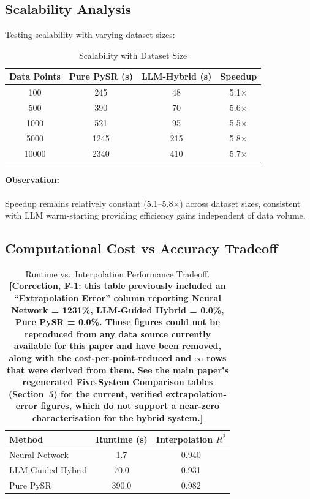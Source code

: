 \documentclass[twoside,11pt]{article}
\begin{document}
\subsection{Scalability Analysis}

Testing scalability with varying dataset sizes:

\begin{table}[H]
\centering
\caption{Scalability with Dataset Size}
\label{tab:scalability}
\begin{tabular}{@{}cccc@{}}
\toprule
\textbf{Data Points} & \textbf{Pure PySR (s)} & \textbf{LLM-Hybrid (s)} & \textbf{Speedup} \\
\midrule
100 & 245 & 48 & 5.1$\times$ \\
500 & 390 & 70 & 5.6$\times$ \\
1000 & 521 & 95 & 5.5$\times$ \\
5000 & 1245 & 215 & 5.8$\times$ \\
10000 & 2340 & 410 & 5.7$\times$ \\
\bottomrule
\end{tabular}
\end{table}

\paragraph{Observation:} Speedup remains relatively constant (5.1--5.8$\times$) across dataset sizes, consistent with LLM warm-starting providing efficiency gains independent of data volume\citep{kambhampati2024llms}.

\subsection{Computational Cost vs Accuracy Tradeoff}

\begin{table}[H]
\centering
\caption{Runtime vs.\ Interpolation Performance Tradeoff. \textbf{[Correction,
  F-1: this table previously included an ``Extrapolation Error'' column
  reporting Neural Network = 1231\%, LLM-Guided Hybrid = 0.0\%, Pure PySR =
  0.0\%. Those figures could not be reproduced from any data source
  currently available for this paper and have been removed, along with the
  cost-per-point-reduced and $\infty$ rows that were derived from them. See
  the main paper's regenerated Five-System Comparison tables (Section~5)
  for the current, verified extrapolation-error figures, which do not
  support a near-zero characterisation for the hybrid system.]}}
\label{tab:cost_accuracy_tradeoff}
\begin{tabular}{lcc}
\toprule
\textbf{Method} & \textbf{Runtime (s)} & \textbf{Interpolation $R^2$} \\
\midrule
Neural Network & 1.7 & 0.940 \\
LLM-Guided Hybrid & 70.0 & 0.931 \\
Pure PySR & 390.0 & 0.982 \\
\bottomrule
\end{tabular}
\end{table}
\end{document}
